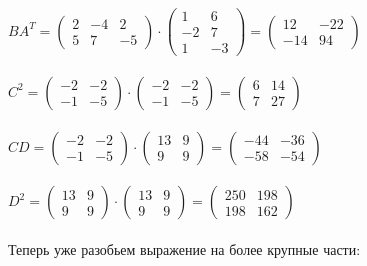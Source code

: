 \documentclass[a4paper, 12pt]{article}
\begin{document}
    \\
    \\ $BA^T = \begin{pmatrix} 2 & -4 & 2 \\ 5 & 7 & -5 \end{pmatrix} \cdot \begin{pmatrix} 1 & 6 \\ -2 & 7 \\ 1 & -3 \end{pmatrix} = \begin{pmatrix}12 & -22\\-14 & 94\end{pmatrix}$
    \\
    \\ $C^2 = \begin{pmatrix}-2 & -2\\-1 & -5\end{pmatrix} \cdot \begin{pmatrix}-2 & -2\\-1 & -5\end{pmatrix} = \begin{pmatrix}6 & 14\\7 & 27\end{pmatrix}$
    \\
    \\ $CD = \begin{pmatrix}-2 & -2\\-1 & -5\end{pmatrix} \cdot \begin{pmatrix}13 & 9\\9 & 9\end{pmatrix} = \begin{pmatrix}-44 & -36\\-58 & -54\end{pmatrix}$
    \\
    \\ $D^2 = \begin{pmatrix}13 & 9\\9 & 9\end{pmatrix} \cdot \begin{pmatrix}13 & 9\\9 & 9\end{pmatrix} = \begin{pmatrix}250 & 198\\198 & 162\end{pmatrix}$
    \\
    \\ Теперь уже разобьем выражение на более крупные части: 
\end{document}
